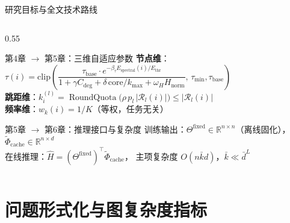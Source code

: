 \documentclass[aspectratio=169,9pt,xcolor=dvipsnames]{beamer}
\newcommand{\highlight}[1]{\textcolor{myred}{\textbf{#1}}}
\newcommand{\kbar}{\ensuremath{\bar{k}}}
\newcommand{\chapternote}{}
\newif\ifshowchapternote
\newcommand{\setchapternote}[1]{%
  \renewcommand{\chapternote}{#1}%
  \showchapternotetrue
}
\begin{document}
\begin{frame}{研究目标与全文技术路线}
\begin{columns}[T]
\begin{column}{0.55\textwidth}
      \smallskip
      \begin{block}{第4章 $\to$ 第5章：三维自适应参数}
        \small
        \textbf{节点维}：$\tau(i)=\mathrm{clip}\!\left(\dfrac{\tau_{\mathrm{base}}\cdot e^{-\beta_\tau E_{\mathrm{spectral}}(i)/E_{\mathrm{thr}}}}{1+\gamma C_{\mathrm{deg}}+\delta\,\mathrm{core}/k_{\max}+\omega_H H_{\mathrm{norm}}},\,\tau_{\min},\tau_{\mathrm{base}}\right)$\\[4pt]
        \textbf{跳距维}：$k_i^{(l)}=\operatorname{RoundQuota}\!\bigl(\rho\,p_l\,|\mathcal{R}_l(i)|\bigr)\leq|\mathcal{R}_l(i)|$\\[2pt]
        \textbf{频率维}：$w_k(i)=1/K$（等权，任务无关）
      \end{block}

      \smallskip
      \begin{block}{第5章 $\to$ 第6章：推理接口与复杂度}
        \small
        训练输出：$\Theta^{\mathrm{fixed}}\in\mathbb{R}^{n\times n}$（离线固化），$\tilde{\Phi}_{\mathrm{cache}}\in\mathbb{R}^{n\times d}$\\[2pt]
        在线推理：$\hat{H}=(\Theta^{\mathrm{fixed}})^\top\tilde{\Phi}_{\mathrm{cache}}$，
        主项复杂度 \highlight{$O(n\kbar d)$}，$\kbar\ll\bar{d}^L$
      \end{block}
    \end{column}
  \end{columns}
\end{frame}

\section{问题形式化与图复杂度指标}
\setchapternote{第3章}

\end{document}
